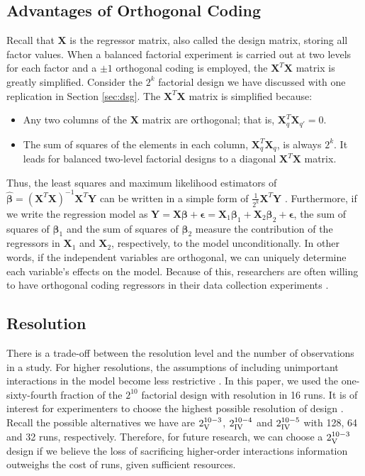 \documentclass[11pt]{article}
\begin{document}
\subsection{Advantages of Orthogonal Coding}\label{sec:oe}
Recall that $\pmb{X}$ is the regressor matrix, also called the design matrix, storing all factor values. When a balanced factorial experiment is carried out at two levels for each factor and a $\pm 1$ orthogonal coding is employed, the $\pmb{X}^{T}\pmb{X}$ matrix is greatly simplified. Consider the $2^{k}$ factorial design we have discussed with one replication in Section \ref{sec:dsg}. The $\pmb{X}^{T}\pmb{X}$ matrix is simplified because:

\begin{itemize}
\item Any two columns of the $\pmb{X}$ matrix are orthogonal; that is, $\pmb{X}^{T}_{q}\pmb{X}_{q'}=0$. 

\item The sum of squares of the elements in each column, $\pmb{X}^{T}_{q}\pmb{X}_{q}$, is always $2^{k}$. It leads for balanced two-level factorial designs to a diagonal $\pmb{X}^{T}\pmb{X}$ matrix. 
\end{itemize}

Thus, the least squares and maximum likelihood estimators of $\pmb{\hat{\beta}}=(\pmb{X}^{T}\pmb{X})^{-1}\pmb{X}^{T}\pmb{Y}$ can be written in a simple form of $\frac{1}{2^{k}}\pmb{X}^{T}\pmb{Y}$ \cite{bk:dae1}. Furthermore, if we write the regression model as $\pmb{Y}=\pmb{X}\pmb{\beta}+\pmb{\epsilon}=\pmb{X}_{1}\pmb{\beta}_{1}+\pmb{X}_{2}\pmb{\beta}_{2}+\pmb{\epsilon}$, the sum of squares of $\pmb{\beta}_{1}$ and the sum of squares of $\pmb{\beta}_{2}$ measure the contribution of the regressors in $\pmb{X}_1$ and $\pmb{X}_2$, respectively, to the model unconditionally. In other words, if the independent variables are orthogonal, we can uniquely determine each variable's effects on the model. Because of this, researchers are often willing to have orthogonal coding regressors in their data collection experiments \cite{bk:ilra}.

\subsection{Resolution}\label{sec:resolution}
There is a trade-off between the resolution level and the number of observations in a study. For higher resolutions, the assumptions of including unimportant interactions in the model become less restrictive \cite{bk:dae2}. In this paper, we used the one-sixty-fourth fraction of the $2^{10}$ factorial design with resolution \MakeUppercase{} in 16 runs. It is of interest for experimenters to choose the highest possible resolution of design \cite{bk:dae1, bk:dae2}. Recall the possible alternatives we have are $2^{10-3}_{\text{\MakeUppercase{\romannumeral 5}}}$, $2^{10-4}_{\text{\MakeUppercase{\romannumeral 4}}}$ and $2^{10-5}_{\text{\MakeUppercase{\romannumeral 4}}}$ with 128, 64 and 32 runs, respectively. Therefore, for future research, we can choose a $2^{10-3}_{\text{\MakeUppercase{\romannumeral 5}}}$ design if we believe the loss of sacrificing higher-order interactions information outweighs the cost of runs, given sufficient resources.
\end{document}
